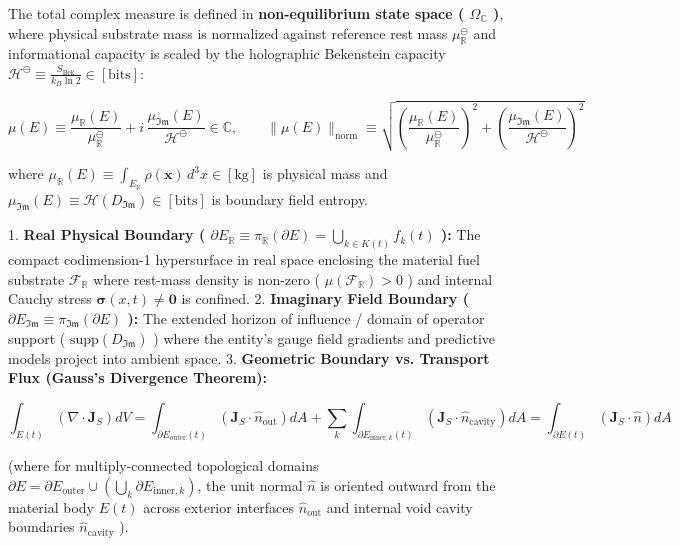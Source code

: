 \documentclass[11pt,a4paper]{article}
\theoremstyle{definition}\newtheorem{definition}{Definition}
\theoremstyle{remark}\newtheorem{remark}{Remark}
\begin{document}
The total complex measure is defined in \textbf{non-equilibrium state space ( $\Omega_{\mathbb{C}}$ )}, where physical substrate mass is normalized against reference rest mass $\mu_{\mathbb{R}}^\ominus$ and informational capacity is scaled by the holographic Bekenstein capacity $\mathcal{H}^\ominus \equiv \frac{S_{\text{Bek}}}{k_B \ln 2} \in [\mathrm{bits}]$:


\begin{equation}
\boxed{\mu(E) \equiv \frac{\mu_{\mathbb{R}}(E)}{\mu_{\mathbb{R}}^\ominus} + i \, \frac{\mu_{\mathfrak{Im}}(E)}{\mathcal{H}^\ominus} \in \mathbb{C}, \qquad \|\mu(E)\|_{\text{norm}} \equiv \sqrt{\left(\frac{\mu_{\mathbb{R}}(E)}{\mu_{\mathbb{R}}^\ominus}\right)^2 + \left(\frac{\mu_{\mathfrak{Im}}(E)}{\mathcal{H}^\ominus}\right)^2}}
\end{equation}


where $\mu_{\mathbb{R}}(E) \equiv \int_{E_{\mathbb{R}}} \rho(\mathbf{x}) \, d^3x \in [\mathrm{kg}]$ is physical mass and $\mu_{\mathfrak{Im}}(E) \equiv \mathcal{H}(D_{\mathfrak{Im}}) \in [\mathrm{bits}]$ is boundary field entropy.

1. \textbf{Real Physical Boundary ( $\partial E_{\mathbb{R}} \equiv \pi_{\mathbb{R}}(\partial E) = \bigcup_{k \in K(t)} f_k(t)$ ):}
The compact codimension-1 hypersurface in real space enclosing the material fuel substrate $\mathcal{F}_{\mathbb{R}}$ where rest-mass density is non-zero ( $\mu(\mathcal{F}_{\mathbb{R}}) > 0$ ) and internal Cauchy stress $\boldsymbol{\sigma}(x, t) \neq \mathbf{0}$ is confined.
2. \textbf{Imaginary Field Boundary ( $\partial E_{\mathfrak{Im}} \equiv \pi_{\mathfrak{Im}}(\partial E)$ ):}
The extended horizon of influence / domain of operator support ( $\text{supp}(D_{\mathfrak{Im}})$ ) where the entity's gauge field gradients and predictive models project into ambient space.
3. \textbf{Geometric Boundary vs. Transport Flux (Gauss's Divergence Theorem):}


\begin{equation}
\boxed{\int_{E(t)} \left( \nabla \cdot \mathbf{J}_S \right) dV = \int_{\partial E_{\text{outer}}(t)} \left( \mathbf{J}_S \cdot \hat{n}_{\text{out}} \right) dA + \sum_k \int_{\partial E_{\text{inner}, k}(t)} \left( \mathbf{J}_S \cdot \hat{n}_{\text{cavity}} \right) dA = \int_{\partial E(t)} \left( \mathbf{J}_S \cdot \hat{n} \right) dA}
\end{equation}


(where for multiply-connected topological domains $\partial E = \partial E_{\text{outer}} \cup (\bigcup_k \partial E_{\text{inner}, k})$, the unit normal $\hat{n}$ is oriented outward from the material body $E(t)$ across exterior interfaces $\hat{n}_{\text{out}}$ and internal void cavity boundaries $\hat{n}_{\text{cavity}}$ ).
\end{document}
